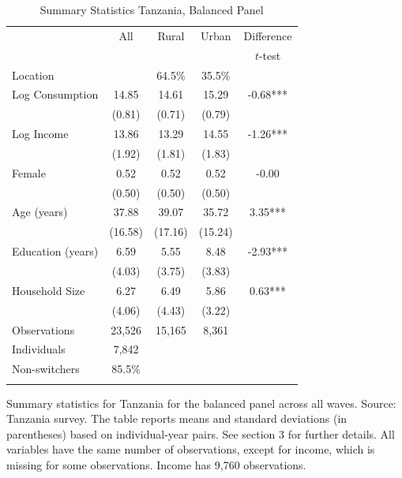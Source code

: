\begin{table}[htbp] \centering \caption{Summary Statistics Tanzania, Balanced Panel}\label{tab:summary_stats_TZA_bal} \begin{threeparttable} \begin{tabular}{l cccc} \toprule
& All & Rural & Urban & Difference \\
 &  &  &  & $t$-test \\
\midrule
Location &  &   64.5\% &   35.5\% &  \\  \addlinespace \addlinespace
Log Consumption & 14.85 & 14.61 & 15.29 & -0.68*** \\
 & (0.81) & (0.71) & (0.79) &  \\  \addlinespace
Log Income & 13.86 & 13.29 & 14.55 & -1.26*** \\
 & (1.92) & (1.81) & (1.83) &  \\  \addlinespace
Female & 0.52 & 0.52 & 0.52 & -0.00 \\
 & (0.50) & (0.50) & (0.50) &  \\  \addlinespace
Age (years) & 37.88 & 39.07 & 35.72 & 3.35*** \\
 & (16.58) & (17.16) & (15.24) &  \\  \addlinespace
Education (years) & 6.59 & 5.55 & 8.48 & -2.93*** \\
 & (4.03) & (3.75) & (3.83) &  \\  \addlinespace
Household Size & 6.27 & 6.49 & 5.86 & 0.63*** \\
 & (4.06) & (4.43) & (3.22) &  \\  \addlinespace


\cmidrule{2-5}
Observations & 23,526 & 15,165 & 8,361 &  \\  
Individuals & 7,842 &  &  &  \\
Non-switchers &   85.5\% &  &  &  \\  \addlinespace
\bottomrule \end{tabular} \begin{tablenotes}[flushleft] \footnotesize \item{Summary statistics for Tanzania for the balanced panel across all waves. Source: Tanzania survey. The table reports means and standard deviations (in parentheses) based on individual-year pairs. See section 3 for further details. All variables have the same number of observations, except for income, which is missing for some observations. Income has 9,760 observations.} \end{tablenotes} \end{threeparttable} \end{table}
